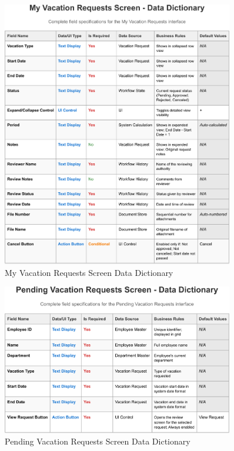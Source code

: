 \documentclass[12pt,a4paper]{article}
\begin{document}
\begin{figure}[H]
\centering
\includegraphics[width=0.9\textwidth]{Data-Dictionary/Screen-Data-Dictionaries/My-Vacation-Requests-Screen-Data-Dictionary/My-Vacation-Requests-Screen-Data-Dictionary-1.png}
\caption{My Vacation Requests Screen Data Dictionary}
\label{fig:my-vacation-requests-data-dict}
\end{figure}

\begin{figure}[H]
\centering
\includegraphics[width=0.9\textwidth]{Data-Dictionary/Screen-Data-Dictionaries/Pending-Vacation-Requests-Screen-Data-Dictionary/Pending-Vacation-Requests-Screen-Data-Dictionary-1.png}
\caption{Pending Vacation Requests Screen Data Dictionary}
\label{fig:pending-vacation-requests-data-dict}
\end{figure}
\end{document}
